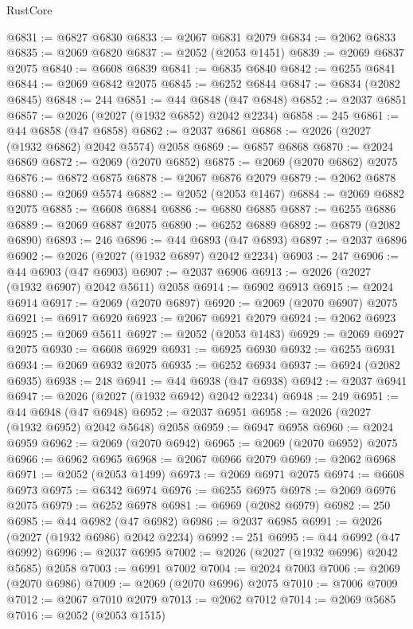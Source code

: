 \begin{lexlean}{RustCore}
\begin{coremodule}
@6831 := @6827 @6830
@6833 := @2067 @6831 @2079
@6834 := @2062 @6833
@6835 := @2069 @6820
@6837 := @2052 (@2053 @1451)
@6839 := @2069 @6837 @2075
@6840 := @6608 @6839
@6841 := @6835 @6840
@6842 := @6255 @6841
@6844 := @2069 @6842 @2075
@6845 := @6252 @6844
@6847 := @6834 (@2082 @6845)
@6848 := 244
@6851 := @44 @6848 (@47 @6848)
@6852 := @2037 @6851
@6857 := @2026 (@2027 (@1932 @6852) @2042 @2234)
@6858 := 245
@6861 := @44 @6858 (@47 @6858)
@6862 := @2037 @6861
@6868 := @2026 (@2027 (@1932 @6862) @2042 @5574) @2058
@6869 := @6857 @6868
@6870 := @2024 @6869
@6872 := @2069 (@2070 @6852)
@6875 := @2069 (@2070 @6862) @2075
@6876 := @6872 @6875
@6878 := @2067 @6876 @2079
@6879 := @2062 @6878
@6880 := @2069 @5574
@6882 := @2052 (@2053 @1467)
@6884 := @2069 @6882 @2075
@6885 := @6608 @6884
@6886 := @6880 @6885
@6887 := @6255 @6886
@6889 := @2069 @6887 @2075
@6890 := @6252 @6889
@6892 := @6879 (@2082 @6890)
@6893 := 246
@6896 := @44 @6893 (@47 @6893)
@6897 := @2037 @6896
@6902 := @2026 (@2027 (@1932 @6897) @2042 @2234)
@6903 := 247
@6906 := @44 @6903 (@47 @6903)
@6907 := @2037 @6906
@6913 := @2026 (@2027 (@1932 @6907) @2042 @5611) @2058
@6914 := @6902 @6913
@6915 := @2024 @6914
@6917 := @2069 (@2070 @6897)
@6920 := @2069 (@2070 @6907) @2075
@6921 := @6917 @6920
@6923 := @2067 @6921 @2079
@6924 := @2062 @6923
@6925 := @2069 @5611
@6927 := @2052 (@2053 @1483)
@6929 := @2069 @6927 @2075
@6930 := @6608 @6929
@6931 := @6925 @6930
@6932 := @6255 @6931
@6934 := @2069 @6932 @2075
@6935 := @6252 @6934
@6937 := @6924 (@2082 @6935)
@6938 := 248
@6941 := @44 @6938 (@47 @6938)
@6942 := @2037 @6941
@6947 := @2026 (@2027 (@1932 @6942) @2042 @2234)
@6948 := 249
@6951 := @44 @6948 (@47 @6948)
@6952 := @2037 @6951
@6958 := @2026 (@2027 (@1932 @6952) @2042 @5648) @2058
@6959 := @6947 @6958
@6960 := @2024 @6959
@6962 := @2069 (@2070 @6942)
@6965 := @2069 (@2070 @6952) @2075
@6966 := @6962 @6965
@6968 := @2067 @6966 @2079
@6969 := @2062 @6968
@6971 := @2052 (@2053 @1499)
@6973 := @2069 @6971 @2075
@6974 := @6608 @6973
@6975 := @6342 @6974
@6976 := @6255 @6975
@6978 := @2069 @6976 @2075
@6979 := @6252 @6978
@6981 := @6969 (@2082 @6979)
@6982 := 250
@6985 := @44 @6982 (@47 @6982)
@6986 := @2037 @6985
@6991 := @2026 (@2027 (@1932 @6986) @2042 @2234)
@6992 := 251
@6995 := @44 @6992 (@47 @6992)
@6996 := @2037 @6995
@7002 := @2026 (@2027 (@1932 @6996) @2042 @5685) @2058
@7003 := @6991 @7002
@7004 := @2024 @7003
@7006 := @2069 (@2070 @6986)
@7009 := @2069 (@2070 @6996) @2075
@7010 := @7006 @7009
@7012 := @2067 @7010 @2079
@7013 := @2062 @7012
@7014 := @2069 @5685
@7016 := @2052 (@2053 @1515)

\end{coremodule}
\end{lexlean}
